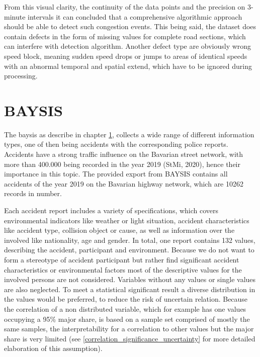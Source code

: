 \documentclass[a4paper,12pt]{report}
\begin{document}
From this visual clarity, the continuity of the data points and the precision on 3-minute intervals it can concluded that a comprehensive algorithmic approach should be able to detect such congestion events. This being said, the dataset does contain defects in the form of missing values for complete road sections, which can interfere with detection algorithm. Another defect type are obviously wrong speed block, meaning sudden speed drops or jumps to areas of identical speeds with an abnormal temporal and spatial extend, which have to be ignored during processing. 

\section{BAYSIS}
\label{dataset_baysis}

The \acrfull{baysis} as describe in chapter \ref{dataset_baysis}, collects a wide range of different information types, one of then being accidents with the corresponding police reports. Accidents have a strong traffic influence on the Bavarian street network, with more than 400.000 being recorded in the year 2019 (StMi, 2020), hence their importance in this topic. The provided export from BAYSIS contains all accidents of the year 2019 on the Bavarian highway network, which are 10262 records in number. 

Each accident report includes a variety of specifications, which covers environmental indicators like weather or light situation, accident characteristics like accident type, collision object or cause, as well as information over the involved like nationality, age and gender. In total, one report contains 132 values, describing the accident, participant and environment. Because we do not want to form a stereotype of accident participant but rather find significant accident characteristics or environmental factors most of the descriptive values for the involved persons are not considered. Variables without any values or single values are also neglected. To meet a statistical significant result a diverse distribution in the values would be preferred, to reduce the risk of uncertain relation. Because the correlation of a non distributed variable, which for example has one values occupying a 95\% major share, is based on a sample set comprised of mostly the same samples, the interpretability for a correlation to other values but the major share is very limited (see \ref{correlation_significance_uncertainty} for more detailed elaboration of this assumption).
\end{document}
